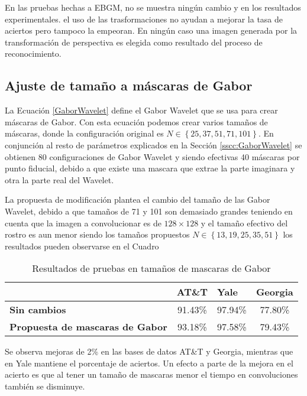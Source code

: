 En las pruebas hechas a \ac{EBGM}, no se muestra ningún cambio y en los resultados experimentales. el uso de las trasformaciones no ayudan a mejorar la tasa de aciertos pero tampoco la empeoran. En ningún caso una imagen generada por la transformación de perspectiva es elegida como resultado del proceso de reconocimiento.

\subsection{Ajuste de tamaño a máscaras de Gabor}
La Ecuación \ref{GaborWavelet} define el Gabor Wavelet que se usa para crear máscaras de Gabor. Con esta ecuación podemos crear varios tamaños de máscaras, donde la configuración original es $N \in \left\{25, 37, 51, 71, 101 \right\}$. En conjunción al resto de parámetros explicados en la Sección \ref{sscc:GaborWavelet} se obtienen 80 configuraciones de Gabor Wavelet y siendo efectivas 40 máscaras por punto fiducial, debido a que existe una mascara que extrae la parte imaginara y otra la parte real del Wavelet.

La propuesta de modificación plantea el cambio del tamaño de las Gabor Wavelet, debido a que tamaños de 71 y 101 son demasiado grandes teniendo en cuenta que la imagen a convolucionar es de $128 \times 128$ y el tamaño efectivo del rostro es aun menor siendo los tamaños propuestos $N \in \left\{13, 19, 25, 35, 51 \right\}$ los resultados pueden observarse en el Cuadro

\begin{table}[h]
\centering
\caption{Resultados de pruebas en tamaños de mascaras de Gabor }
\label{ta:ResultadosMascaras}
\begin{tabular}{|l|c|c|c|}
\hline
\textbf{}                                         & \multicolumn{1}{l|}{\textbf{AT\&T}} & \multicolumn{1}{l|}{\textbf{Yale}} & \multicolumn{1}{l|}{\textbf{Georgia}} \\ \hline
\textbf{Sin cambios}                              & 91.43\%                             & 97.94\%                            & 77.80\%                               \\ \hline
\textbf{Propuesta de mascaras de Gabor} & 93.18\%                             & 97.58\%                            & 79.43\%                               \\ \hline
\end{tabular}
\end{table}

Se observa mejoras de 2\% en las bases de datos AT\&T y Georgia, mientras que en Yale mantiene el porcentaje de aciertos. Un efecto a parte de la mejora en el acierto es que al tener un tamaño de mascaras menor el tiempo en convoluciones también se disminuye.
